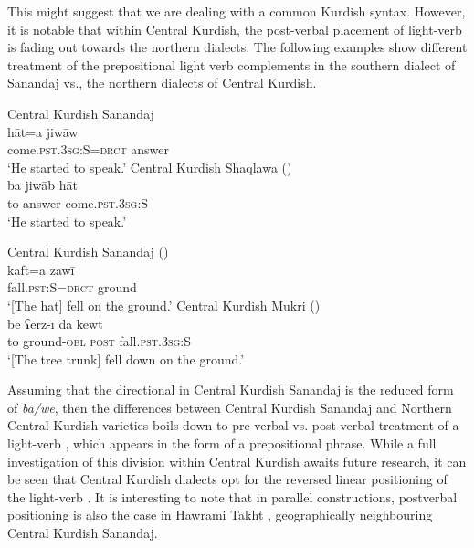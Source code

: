 \documentclass[output=paper,colorlinks,citecolor=brown]{langscibook}
\begin{document}
\begin{sloppypar}
This might suggest that we are dealing with a common Kurdish syntax. However, it is notable that within Central Kurdish, the post-verbal placement of light-verb  is fading out towards the northern dialects. The following examples show different treatment of the prepositional light verb complements in the southern dialect of Sanandaj vs., the northern dialects of Central Kurdish.

\ea
\ea\label{MGKC:ex:22a}
Central Kurdish Sanandaj  \\
\gll hāt=a jiwāw \\
come\textsc{.pst.3sg:S=drct} answer \\
\glt `He started to speak.'
\ex\label{MGKC:ex:22b}
Central Kurdish Shaqlawa (\citealt[194]{Khanetal2022FolkloreII}) \\
\gll ba jiwāb hāt \\
to answer come\textsc{.pst.3sg:S} \\
\glt `He started to speak.' \\
\z
\z 

\ea
\ea\label{MGKC:ex:23a}
Central Kurdish Sanandaj (\citealt[F, 0644]{mohammadirad_Sanandaj_Kurdish_2022}) \\
\gll kaft=a zawī \\
fall\textsc{.pst:S=drct} ground \\
\glt `[The hat] fell on the ground.'
\ex\label{MGKC:ex:23b}
Central Kurdish Mukri (\citealt[251]{Opengin2016}) \\
\gll be ʕerz-ī dā kewt \\
to ground\textsc{-obl} \textsc{post} fall\textsc{.pst.3sg:S} \\
\glt `[The tree trunk] fell down on the ground.' \\
\z
\z 

Assuming that the directional  in Central Kurdish Sanandaj is the reduced form of  \textit{ba/we}, then the differences between Central Kurdish Sanandaj and Northern Central Kurdish varieties boils down to pre-verbal vs. post-verbal treatment of a light-verb , which appears in the form of a prepositional phrase. While a full investigation of this division within Central Kurdish awaits future research, it can be seen that Central Kurdish dialects opt for the reversed linear positioning of the light-verb . It is interesting to note that in parallel constructions, postverbal positioning is also the case in Hawrami Takht , geographically neighbouring Central Kurdish Sanandaj. 


\end{sloppypar}
\end{document}
